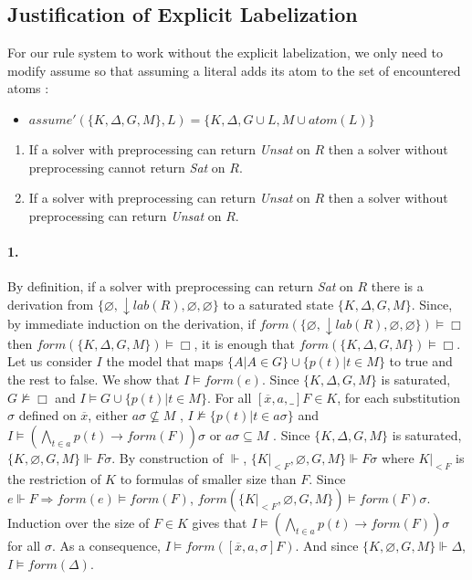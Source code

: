 \documentclass[a4paper,10pt]{report}
\newcommand{\atom}{\mathit{atom}}
\newcommand{\F}{\mathit{form}}
\newcommand{\T}{\mathit{lab}}
\newcommand{\A}{\mathit{assume}}
\begin{document}
\subsection{Justification of Explicit Labelization}
For our rule system to work without the explicit labelization, we only need to modify assume so that
assuming a literal adds its atom to the set of encountered atoms :
\begin{itemize}
 \item $\A'(\{K,\Delta,G,M\},L) = \{K,\Delta,G\cup L, M\cup\atom(L)\}$
\end{itemize}

\begin{enumerate}
 \item If a solver with preprocessing can return \emph{Unsat} on $R$ then a solver without
preprocessing cannot return \emph{Sat} on $R$.
 \item If a solver with preprocessing can return \emph{Unsat} on $R$ then a solver without
preprocessing can return \emph{Unsat} on $R$.
\end{enumerate}
\paragraph{1.} By definition, if a solver with preprocessing can return \emph{Sat} on $R$ there is a
derivation from $\{\varnothing, \downarrow\T(R), \varnothing, \varnothing\}$ to a saturated state
$\{K, \Delta, G, M\}$. Since, by immediate induction on the derivation, if
$\F(\{\varnothing, \downarrow\T(R), \varnothing, \varnothing\})\vDash\Box$ then
$\F(\{K, \Delta, G, M \})\vDash\Box$, it is enough that $\F(\{K, \Delta, G, M\})\vDash\Box$. Let
us consider $I$ the model that maps $\{A|A\in G\}\cup\{p(t)|t\in M\}$ to true and the rest to false.
We show that $I\vDash\F(e)$. Since $\{K,\Delta, G, M\}$ is saturated, $G\nvDash\Box$
and $I\vDash G\cup\{p(t)|t\in M\}$. For all $[\overline x, a,\_]F\in K$, for
each substitution $\sigma$ defined on $\overline x$, either $a\sigma\nsubseteq M$ ,
$I\nvDash\{p(t)|t\in a\sigma\}$ and $I\vDash(\bigwedge_{t\in a} p(t)\rightarrow\F(F))\sigma$ or
$a\sigma\subseteq M$ . Since $\{K,\Delta, G, M\}$ is saturated, $\{K, \varnothing, G, M\}\Vdash F\sigma$.
By construction of $\Vdash$, $\{K|_{<F} ,\varnothing, G, M\}\Vdash F\sigma$ where $K|_{<F}$ is the
restriction of $K$ to formulas of smaller size than $F$. Since $e\Vdash F\Rightarrow\F(e)\vDash\F(F)$,
$\F(\{K|_{<F} ,\varnothing, G, M\})\vDash\F(F)\sigma$. Induction over the size of $F\in K$
gives that $I\vDash(\bigwedge_{t\in a}p(t)\rightarrow\F(F))\sigma$ for all $\sigma$.
As a consequence, $I\vDash\F([\overline x, a,\sigma]F )$. And since
$\{K, \varnothing, G, M\}\Vdash\Delta$, $I\vDash\F(\Delta)$.
\end{document}
